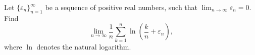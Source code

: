 \documentclass{article}
\begin{document}
\setlength{\parindent}{0pt}

Let $\{\varepsilon_n\}_{n=1}^\infty$ be a sequence of positive real numbers, such that $\lim_{n\to \infty} \varepsilon_n=0.$ 
Find 
\[
\lim_{n\to \infty} \frac{1}{n}\sum_{k=1}^n \ln \left(\frac{k}{n}+\varepsilon_n\right),
\]
where $\ln$ denotes the natural logarithm.
\end{document}
